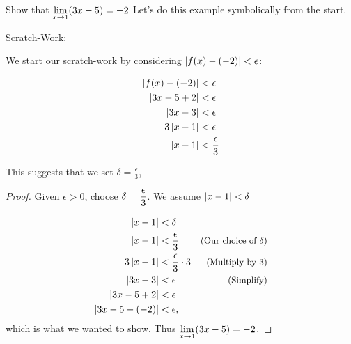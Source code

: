 \begin{example}\label{ex_compute_limNew7}%
Show that $\displaystyle \lim_{x\to 1}(3x-5)=-2$
\solution
Let's do this example symbolically from the start.

Scratch-Work:

We start our scratch-work by considering $\left\lvert f(x)-(-2) \right\rvert<\epsilon$:

\begin{align*}
\left\lvert f(x)-(-2) \right\rvert&<\epsilon \\
\left\lvert 3x-5+2 \right\rvert&<\epsilon \\
\left\lvert 3x-3 \right\rvert&<\epsilon\\
3\left\lvert x-1 \right\rvert&<\epsilon \\
\left\lvert x-1 \right\rvert&<\frac{\epsilon}{3}\\
\end{align*}

This suggests that we set $\delta=\frac{\epsilon}{3}$,

\begin{proof}
Given $\epsilon>0$, choose $\displaystyle \delta=\frac{\epsilon}{3}$. We assume $\left\lvert x-1 \right\rvert<\delta$

\small
\begin{align*}
\left\lvert x - 1 \right\rvert &< \delta &\\
\left\lvert x - 1 \right\rvert &< \frac{\epsilon}{3}&  \text{\small(Our choice of $\delta$)}\\
3\left\lvert x - 1 \right\rvert &< \frac{\epsilon}{3}\cdot 3 &  \text{\small(Multiply by 3)}\\
\left\lvert 3x-3 \right\rvert&< \epsilon &  \text{\small(Simplify)}\\
\left\lvert 3x-5+2 \right\rvert&< \epsilon & \\
\left\lvert 3x-5-(-2) \right\rvert&< \epsilon, &
\end{align*}
\normalsize
which is what we wanted to show. Thus  $\displaystyle \lim_{x\to 1}(3x-5)=-2$.\qedhere
\end{proof}
\end{example}

